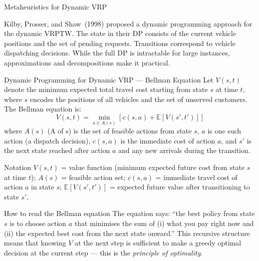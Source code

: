 \documentclass[aspectratio=169,10pt]{beamer}
\begin{document}
\begin{frame}[allowframebreaks]{Metaheuristics for Dynamic VRP}
  \framebreak

  Kilby, Prosser, and Shaw~(1998) proposed a dynamic programming approach
  for the dynamic VRPTW.  The state in their DP consists of the current
  vehicle positions and the set of pending requests.  Transitions correspond
  to vehicle dispatching decisions.  While the full DP is intractable for
  large instances, approximations and decompositions make it practical.

  \begin{block}{Dynamic Programming for Dynamic VRP — Bellman Equation}
    Let $V(s, t)$ denote the minimum expected total travel cost starting from
    state $s$ at time $t$, where $s$ encodes the positions of all vehicles and
    the set of unserved customers.  The Bellman equation is:
    \[
      V(s, t) = \min_{a \in A(s)} \left[ c(s, a) + \mathbb{E}[V(s', t')] \right]
    \]
    where $A(s)$ (A of s) is the set of feasible actions from state $s$,
    $a$ is one such action (a dispatch decision), $c(s, a)$ is the immediate
    cost of action $a$, and $s'$ is the next state reached after action $a$
    and any new arrivals during the transition.
  \end{block}

  \begin{block}{Notation}
    $V(s, t)$ = value function (minimum expected future cost from state $s$
    at time $t$); $A(s)$ = feasible action set; $c(s, a)$ = immediate travel
    cost of action $a$ in state $s$; $\mathbb{E}[V(s', t')]$ = expected
    future value after transitioning to state $s'$.
  \end{block}

  \begin{alertblock}{How to read the Bellman equation}
    The equation says: ``the best policy from state $s$ is to choose action
    $a$ that minimises the sum of (i) what you pay right now and (ii) the
    expected best cost from the next state onward.''  This recursive structure
    means that knowing $V$ at the next step is sufficient to make a greedy
    optimal decision at the current step — this is the \emph{principle of
    optimality}.
  \end{alertblock}

\end{frame}
\end{document}
